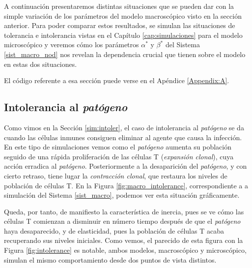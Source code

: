 A continuación presentaremos distintas situaciones que se pueden dar con la simple variación de los parámetros del modelo macroscópico visto en la sección anterior. Para poder comparar estos resultados, se simulan las situaciones de tolerancia e intolerancia vistas en el Capítulo \ref{cap:simulaciones} para el modelo microscópico y veremos cómo los parámetros $\alpha^{*}$ y $\beta^{*}$ del Sistema \ref{sist_macro_nod} nos revelan la dependencia crucial que tienen sobre el modelo en estas dos situaciones.

El código referente a esa sección puede verse en el Apéndice \ref{Appendix:A}.



\subsection{Intolerancia al \textit{patógeno}}
\label{sub:simMacroIntoler}

Como vimos en la Sección \ref{sim:intoler}, el caso de intolerancia al \textit{patógeno} se da cuando las células inmunes consiguen eliminar al agente que causa la infección. 
En este tipo de simulaciones vemos como el \textit{patógeno} aumenta su población seguido de una rápida proliferación de las células T (\textit{expansión clonal}), cuya acción erradica al \textit{patógeno}. Posteriormente a la desaparición del \textit{patógeno}, y con cierto retraso, tiene lugar la \textit{contracción clonal}, que restaura los niveles de población de células T. En la Figura \ref{fig:macro_intolerance}, correspondiente a a simulación del Sistema \ref{sist_macro}, podemos ver esta situación gráficamente. 

Queda, por tanto, de manifiesto la característica de inercia, pues se ve cómo las células T comienzan a disminuir en número tiempo después de que el \textit{patógeno} haya desaparecido, y de elasticidad, pues la población de células T acaba recuperando sus niveles iniciales. Como vemos, el parecido de esta figura con la Figura \ref{fig:intolerance} es notable, ambos modelos, macroscópico y microscópico, simulan el mismo comportamiento desde dos puntos de vista distintos.



